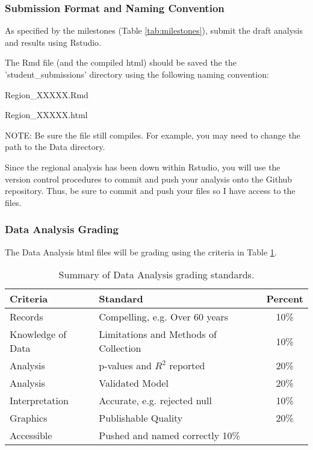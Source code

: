 \subsubsection{Submission Format and Naming Convention}

As specified by the milestones (Table \ref{tab:milestones}), submit the draft analysis and results using Rstudio. 

The Rmd file (and the compiled html) should be saved the the 'student\_submissions' directory using the following naming convention:

\begin{centering}
Region\_XXXXX.Rmd 

Region\_XXXXX.html
\end{centering}

NOTE: Be sure the file still compiles. For example, you may need to change the path to the Data directory. 

Since the regional analysis has been down within Rstudio, you will use the version control procedures to commit and push your analysis onto the Github repository. Thus, be sure to commit and push your files so I have access to the files. 

\subsubsection{Data Analysis Grading}

The Data Analysis html files will be grading using the criteria in Table \ref{tab:datagrading}.

\begin{table}[h]
\caption{Summary of Data Analysis grading standards.}
\label{tab:datagrading}
\begin{tabular}{llc}\hline
Criteria            &   Standard    & Percent \\ \hline\hline
Records  & Compelling, e.g. Over 60 years & 10\% \\
Knowledge of Data & Limitations and Methods of Collection & 10\% \\
Analysis & p-values and $R^2$ reported  & 20\% \\
Analysis          & Validated Model     & 20\% \\
Interpretation    & Accurate, e.g. rejected null   & 10\% \\
Graphics          & Publishable Quality & 20\% \\
Accessible        & Pushed and named correctly  10\% \\
\hline
\end{tabular}
\end{table}